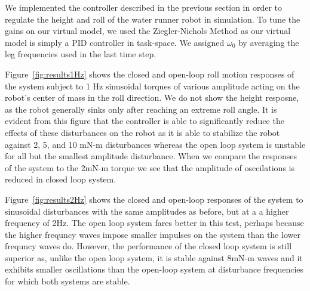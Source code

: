We implemented the controller described in the previous section in order to regulate the height and roll of the water runner robot in simulation. To tune the gains on our virtual model, we used the Ziegler-Nichols Method as our virtual model is simply a PID controller in task-space. We assigned $\omega_0$ by averaging the leg frequencies used in the last time step.

Figure~\ref{fig:results1Hz} shows the closed and open-loop roll motion responses of the system subject to 1 Hz sinusoidal torques of various amplitude acting on the robot's center of mass in the roll direction. We do not show the height resposne, as the robot generally sinks only after reaching an extreme roll angle. It is evident from this figure that the controller is able to significantly reduce the effects of these disturbances on the robot as it is able to stabilize the robot against 2, 5, and 10 mN-m disturbances whereas the open loop system is unstable for all but the smallest amplitude disturbance. When we compare the responses of the system to the 2mN-m torque we see that the amplitude of osccilations is reduced in closed loop system.

Figure~\ref{fig:results2Hz} shows the closed and open-loop responses of the system to sinusoidal disturbances with the same amplitudes as before, but at a a higher frequency of 2Hz. The open loop system fares better in this test, perhaps because the higher frequncy waves impose smaller impulses on the system than the lower frequncy waves do. However, the performance of the closed loop system is still superior as, unlike the open loop system, it is stable against 8mN-m waves and it exhibits smaller oscillations than the open-loop system at disturbance frequencies for which both systems are stable.

